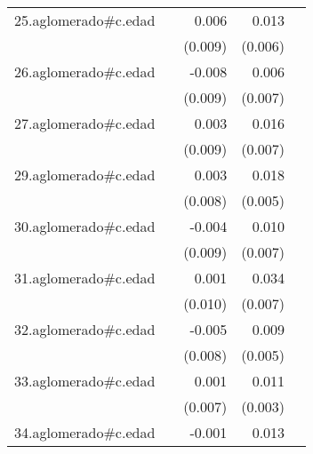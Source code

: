 {\begin{longtable}{l*{4}{D{.}{.}{-1}}}
\addlinespace
25.aglomerado#c.edad&                     &       0.006         &       0.013\sym{*}  &                     \\
            &                     &     (0.009)         &     (0.006)         &                     \\
\addlinespace
26.aglomerado#c.edad&                     &      -0.008         &       0.006         &                     \\
            &                     &     (0.009)         &     (0.007)         &                     \\
\addlinespace
27.aglomerado#c.edad&                     &       0.003         &       0.016\sym{*}  &                     \\
            &                     &     (0.009)         &     (0.007)         &                     \\
\addlinespace
29.aglomerado#c.edad&                     &       0.003         &       0.018\sym{***}&                     \\
            &                     &     (0.008)         &     (0.005)         &                     \\
\addlinespace
30.aglomerado#c.edad&                     &      -0.004         &       0.010         &                     \\
            &                     &     (0.009)         &     (0.007)         &                     \\
\addlinespace
31.aglomerado#c.edad&                     &       0.001         &       0.034\sym{***}&                     \\
            &                     &     (0.010)         &     (0.007)         &                     \\
\addlinespace
32.aglomerado#c.edad&                     &      -0.005         &       0.009         &                     \\
            &                     &     (0.008)         &     (0.005)         &                     \\
\addlinespace
33.aglomerado#c.edad&                     &       0.001         &       0.011\sym{***}&                     \\
            &                     &     (0.007)         &     (0.003)         &                     \\
\addlinespace
34.aglomerado#c.edad&                     &      -0.001         &       0.013         &                     \\

\end{longtable}}
